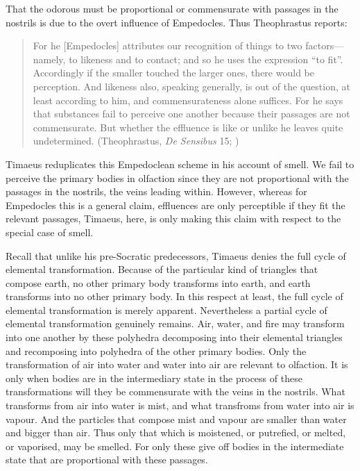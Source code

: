 That the odorous must be proportional or commensurate with passages in the nostrils is due to the overt influence of Empedocles. Thus Theophrastus reports:
\begin{quote}
	For he [Empedocles] attributes our recognition of things to two factors---namely, to likeness and to contact; and so he uses the expression ``to fit''. Accordingly if the smaller touched the larger ones, there would be perception. And likeness also, speaking generally, is out of the question, at least according to him, and commensurateness alone suffices. For he says that substances fail to perceive one another because their passages are not commensurate. But whether the effluence is like or unlike he leaves quite undetermined. (Theophrastus, \emph{De Sensibus} 15; \citealt[79]{Stratton:1917vn})
\end{quote}
Timaeus reduplicates this Empedoclean scheme in his account of smell. We fail to perceive the primary bodies in olfaction since they are not proportional with the passages in the nostrils, the veins leading within. However, whereas for Empedocles this is a general claim, effluences are only perceptible if they fit the relevant passages, Timaeus, here, is only making this claim with respect to the special case of smell.

Recall that unlike his pre-Socratic predecessors, Timaeus denies the full cycle of elemental transformation. Because of the particular kind of triangles that compose earth, no other primary body transforms into earth, and earth transforms into no other primary body. In this respect at least, the full cycle of elemental transformation is merely apparent. Nevertheless a partial cycle of elemental transformation genuinely remains. Air, water, and fire may transform into one another by these polyhedra decomposing into their elemental triangles and recomposing into polyhedra of the other primary bodies. Only the transformation of air into water and water into air are relevant to olfaction. It is only when bodies are in the intermediary state in the process of these transformations will they be commensurate with the veins in the nostrils. What transforms from air into water is mist, and what transfroms from water into air is vapour. And the particles that compose mist and vapour are smaller than water and bigger than air. Thus only that which is moistened, or putrefied, or melted, or vaporised, may be smelled. For only these give off bodies in the intermediate state that are proportional with these passages.


